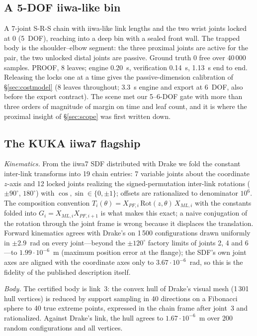 \documentclass[10pt,twocolumn,letterpaper]{article}
\begin{document}
\subsection{A 5-DOF iiwa-like bin}\label{sec:bin}
A 7-joint S-R-S chain with iiwa-like link lengths and the two wrist joints locked at 0 (5~DOF), reaching into a deep bin with a sealed front wall. The trapped body is the shoulder--elbow segment: the three proximal joints are active for the pair, the two unlocked distal joints are passive. Ground truth 0 free over 40\,000 samples. PROOF, 8 leaves; engine 0.20~s, verification 0.14~s, 1.13~s end to end. Releasing the locks one at a time gives the passive-dimension calibration of \S\ref{sec:costmodel} (8 leaves throughout; 3.3~s engine and export at 6~DOF, also before the export contract). The scene met our 5--6-DOF gate with more than three orders of magnitude of margin on time and leaf count, and it is where the proximal insight of \S\ref{sec:scope} was first written down.

\subsection{The KUKA iiwa7 flagship}\label{sec:flagship}
\emph{Kinematics.} From the iiwa7 SDF distributed with Drake we fold the constant inter-link transforms into 19 chain entries: 7 variable joints about the coordinate $z$-axis and 12 locked joints realizing the signed-permutation inter-link rotations ($\pm90^\circ$, $180^\circ$) with $\cos,\sin\in\{0,\pm1\}$; offsets are rationalized to denominator $10^6$. The composition convention $T_i(\theta)=X_{PF,i}\,\mathrm{Rot}(z,\theta)\,X_{ML,i}$ with the constants folded into $G_i=X_{ML,i}X_{PF,i+1}$ is what makes this exact; a naive conjugation of the rotation through the joint frame is wrong because it displaces the translation. Forward kinematics agrees with Drake's on 1\,500 configurations drawn uniformly in $\pm2.9$~rad on every joint---beyond the $\pm120^\circ$ factory limits of joints 2, 4 and 6---to $1.99\cdot10^{-6}$~m (maximum position error at the flange); the SDF's own joint axes are aligned with the coordinate axes only to $3.67\cdot10^{-6}$~rad, so this is the fidelity of the published description itself.

\emph{Body.} The certified body is link~3: the convex hull of Drake's visual mesh (1\,301 hull vertices) is reduced by support sampling in 40 directions on a Fibonacci sphere to 40 true extreme points, expressed in the chain frame after joint~3 and rationalized. Against Drake's link, the hull agrees to $1.67\cdot10^{-6}$~m over 200 random configurations and all vertices.
\end{document}
